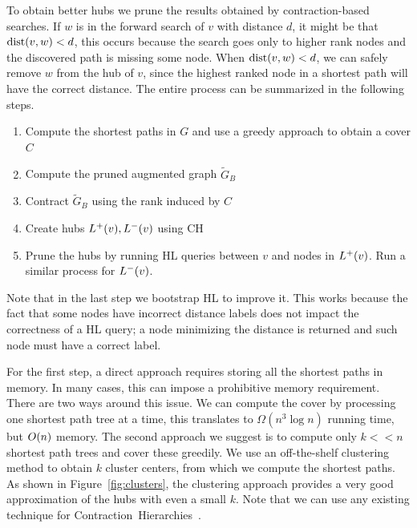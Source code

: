 To obtain better hubs we prune the results obtained by contraction-based searches.
If $w$ is in the forward search of $v$ with distance $d$, it might be that $\text{dist}(v,w)<d$, this occurs because the search goes only to higher rank nodes and the discovered path is missing some node.
When $\text{dist}(v,w)<d$, we can safely remove $w$ from the hub of $v$, since the highest ranked node in a shortest path will have the correct distance.
The entire process can be summarized in the following steps.

\begin{enumerate}[nosep]
\item Compute the shortest paths in $G$ and use a greedy approach to obtain a cover $C$
\item Compute the pruned augmented graph $\tilde G_B$
\item Contract $\tilde G_B$ using the rank induced by $C$
\item Create hubs $L^+(v),L^-(v)$ using CH
\item Prune the hubs by running HL queries between $v$ and nodes in $L^+(v)$. 
Run a similar process for $L^-(v)$.
\end{enumerate}
Note that in the last step we bootstrap HL to improve it.
This works because the fact that some nodes have incorrect distance labels does not impact the correctness of a HL query; a node minimizing the distance is returned and such node must have a correct label.

\begin{remark}
For the first step, a direct approach requires storing all the shortest paths in memory.
In many cases, this can impose a prohibitive memory requirement.
There are two ways around this issue.
We can compute the cover by processing one shortest path tree at a time, this translates to $\Omega(n^3\log n)$ running time, but $O(n)$ memory.
The second approach we suggest is to compute only $k<<n$ shortest path trees and cover these greedily.
We use an off-the-shelf clustering method to obtain $k$ cluster centers, from which we compute the shortest paths. 
As shown in Figure~\ref{fig:clusters}, the clustering approach provides a very good approximation of the hubs with even a small $k$.
Note that we can use any existing technique for Contraction~Hierarchies~\cite{rice_csp,hubimplem}.
\end{remark}

